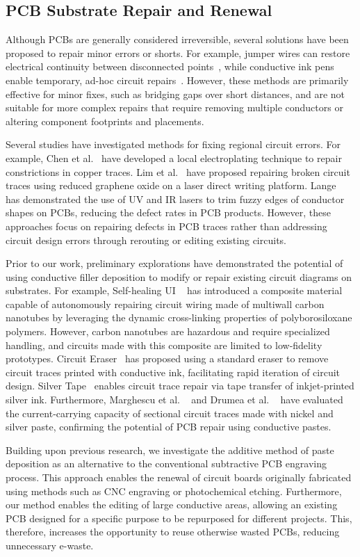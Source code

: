 \subsection{PCB Substrate Repair and Renewal}
Although PCBs are generally considered irreversible, several solutions have been proposed to repair minor errors or shorts. 
For example, jumper wires can restore electrical continuity between disconnected points~\cite{flyWire}, while conductive ink pens enable temporary, ad-hoc circuit repairs~\cite{trace_repair}. 
However, these methods are primarily effective for minor fixes, such as bridging gaps over short distances, and are not suitable for more complex repairs that require removing multiple conductors or altering component footprints and placements.

Several studies have investigated methods for fixing regional circuit errors. 
For example, Chen et al.~\cite{chen1991self} have developed a local electroplating technique to repair constrictions in copper traces.
Lim et al.~\cite{graphinePrint} have proposed repairing broken circuit traces using reduced graphene oxide on a laser direct writing platform.
Lange~\cite{lange2005pcb} has demonstrated the use of UV and IR lasers to trim fuzzy edges of conductor shapes on PCBs, reducing the defect rates in PCB products.
However, these approaches focus on repairing defects in PCB traces rather than addressing circuit design errors through rerouting or editing existing circuits.

Prior to our work, preliminary explorations have demonstrated the potential of using conductive filler deposition to modify or repair existing circuit diagrams on substrates.
For example, Self-healing UI ~\cite{self-healing} has introduced a composite material
capable of autonomously repairing circuit wiring made of multiwall carbon nanotubes by leveraging the dynamic cross-linking properties of polyborosiloxane polymers.
However, carbon nanotubes are hazardous and require specialized handling, and circuits made with this composite are limited to low-fidelity prototypes.
Circuit Eraser~\cite{circuiteraser} has proposed using a standard eraser to remove circuit traces printed with conductive ink, facilitating rapid iteration of circuit design.
Silver Tape~\cite{10.1145/3381013} enables circuit trace repair via tape transfer of inkjet-printed silver ink.
Furthermore, Marghescu et al. ~\cite{silverRepairCurrent} and Drumea et al. ~\cite{NiRepairCurrent} have evaluated the current-carrying capacity of sectional circuit traces made with nickel and silver paste, confirming the potential of PCB repair using conductive pastes.



Building upon previous research, we investigate the additive method of paste deposition as an alternative to the conventional subtractive PCB engraving process.
This approach enables the renewal of circuit boards originally fabricated using methods such as CNC engraving or photochemical etching. 
Furthermore, our method enables the editing of large conductive areas, allowing an existing PCB designed for a specific purpose to be repurposed for different projects. 
This, therefore, increases the opportunity to reuse otherwise wasted PCBs, reducing unnecessary e-waste.